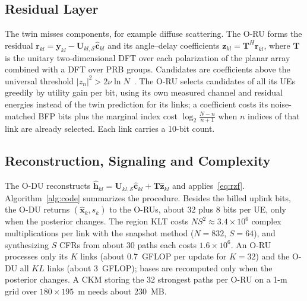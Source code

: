 \documentclass[journal]{IEEEtran}
\newcommand{\vect}[1]{\mathbf{#1}}
\begin{document}
\subsection{Residual Layer}
The twin misses components, for example diffuse scattering. The O-RU forms the residual $\vect{r}_{kl}=\vect{y}_{kl}-\vect{U}_{kl,\mathcal{S}}\hat{\vect{c}}_{kl}$ and its angle--delay coefficients $\vect{z}_{kl}=\vect{T}^{H}\vect{r}_{kl}$, where $\vect{T}$ is the unitary two-dimensional DFT over each polarization of the planar array combined with a DFT over PRB groups. Candidates are coefficients above the universal threshold $|z_n|^2>2\nu\ln N$~\cite{donoho1994ideal}. The O-RU selects candidates of all its UEs greedily by utility gain per bit, using its own measured channel and residual energies instead of the twin prediction for its links; a coefficient costs its noise-matched BFP bits plus the marginal index cost $\log_2\frac{N-n}{n+1}$ when $n$ indices of that link are already selected. Each link carries a 10-bit count.

\subsection{Reconstruction, Signaling and Complexity}
The O-DU reconstructs $\hat{\vect{h}}_{kl}=\vect{U}_{kl,\mathcal{S}}\hat{\vect{c}}_{kl}+\vect{T}\hat{\vect{z}}_{kl}$ and applies~\eqref{eq:rzf}. Algorithm~\ref{alg:code} summarizes the procedure. Besides the billed uplink bits, the O-DU returns $(\hat{\vect{x}}_k,s_k)$ to the O-RUs, about 32 plus 8 bits per UE, only when the posterior changes. The region KLT costs $NS^2\approx3.4\times10^6$ complex multiplications per link with the snapshot method ($N=832$, $S=64$), and synthesizing $S$ CFRs from about 30 paths each costs $1.6\times10^6$. An O-RU processes only its $K$ links (about 0.7~GFLOP per update for $K=32$) and the O-DU all $KL$ links (about 3~GFLOP); bases are recomputed only when the posterior changes. A CKM storing the 32 strongest paths per O-RU on a 1-m grid over $180\times195$~m needs about 230~MB.
\end{document}
